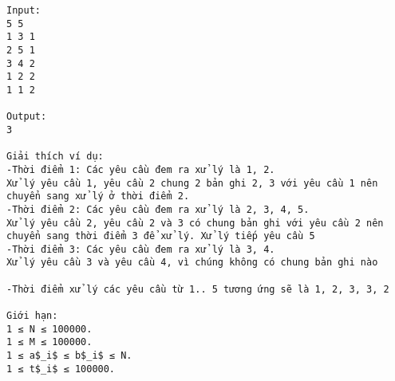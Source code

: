 \begin{verbatim}
Input:
5 5
1 3 1
2 5 1
3 4 2
1 2 2
1 1 2

Output:
3

Giải thích ví dụ: 
-Thời điểm 1: Các yêu cầu đem ra xử lý là 1, 2.
Xử lý yêu cầu 1, yêu cầu 2 chung 2 bản ghi 2, 3 với yêu cầu 1 nên chuyển sang xử lý ở thời điểm 2.
-Thời điểm 2: Các yêu cầu đem ra xử lý là 2, 3, 4, 5.
Xử lý yêu cầu 2, yêu cầu 2 và 3 có chung bản ghi với yêu cầu 2 nên chuyển sang thời điểm 3 để xử lý. Xử lý tiếp yêu cầu 5
-Thời điểm 3: Các yêu cầu đem ra xử lý là 3, 4.
Xử lý yêu cầu 3 và yêu cầu 4, vì chúng không có chung bản ghi nào

-Thời điểm xử lý các yêu cầu từ 1.. 5 tương ứng sẽ là 1, 2, 3, 3, 2

Giới hạn:
1 ≤ N ≤ 100000. 
1 ≤ M ≤ 100000.
1 ≤ a$_i$ ≤ b$_i$ ≤ N. 
1 ≤ t$_i$ ≤ 100000. 

\end{verbatim}